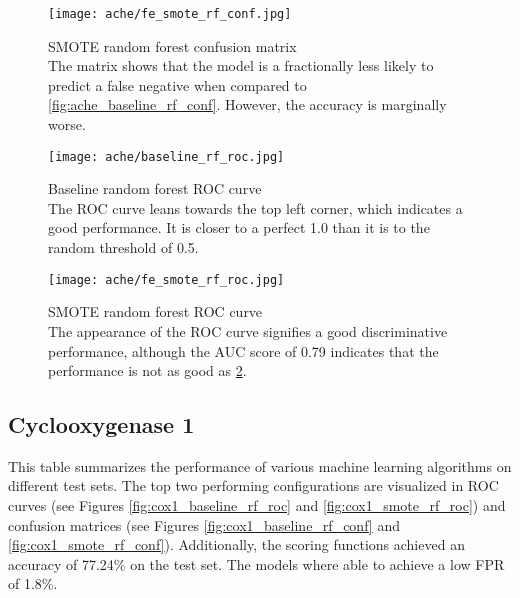 \begin{figure}[H]
    \begin{center}
        \captionsetup{justification=centering}
        \texttt{[image: ache/fe\_smote\_rf\_conf.jpg]}
        \caption[]{SMOTE random forest confusion matrix\\The matrix shows that the model is a fractionally less likely to predict a false negative when compared to \ref*{fig:ache_baseline_rf_conf}. However, the accuracy is marginally worse.}
        \label{fig:ache_smote_rf_conf}
    \end{center}
\end{figure}

\begin{figure}[H]
    \begin{center}
        \captionsetup{justification=centering}
        \texttt{[image: ache/baseline\_rf\_roc.jpg]}
        \caption[]{Baseline random forest ROC curve\\The ROC curve leans towards the top left corner, which indicates a good performance. It is closer to a perfect 1.0 than it is to the random threshold of 0.5.}
        \label{fig:ache_baseline_rf_roc}
    \end{center}
\end{figure}

\begin{figure}[H]
    \begin{center}
        \captionsetup{justification=centering}
        \texttt{[image: ache/fe\_smote\_rf\_roc.jpg]}
        \caption[]{SMOTE random forest ROC curve\\The appearance of the ROC curve signifies a good discriminative performance, although the AUC score of 0.79 indicates that the performance is not as good as \ref*{fig:ache_baseline_rf_roc}.        }
        \label{fig:ache_smote_rf_roc}
    \end{center}
\end{figure}

\subsection{Cyclooxygenase 1}
This table summarizes the performance of various machine learning algorithms on different test sets.
The top two performing configurations are visualized in ROC curves (see Figures \ref{fig:cox1_baseline_rf_roc} and \ref{fig:cox1_smote_rf_roc})
and confusion matrices (see Figures \ref{fig:cox1_baseline_rf_conf} and \ref{fig:cox1_smote_rf_conf}). Additionally,
the scoring functions achieved an accuracy of 77.24\% on the test set. The models where able to achieve a low FPR of 1.8\%.

